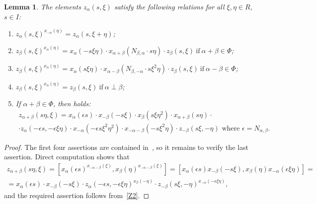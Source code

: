 \documentclass[oneside, 8pt]{amsart}
\newtheorem{lemma}{Lemma}
\theoremstyle{remark}
\theoremstyle{definition}
\numberwithin{lemma}{section}
\numberwithin{prop}{section}
\numberwithin{corollary}{section}
\numberwithin{externaltheorem}{section}
\numberwithin{equation}{section}
\begin{document}
\begin{lemma}\label{Zrels} The elements $z_\alpha(s, \xi)$ satisfy the following relations for all $\xi, \eta\in R$, $s\in I$:
\begin{enumerate} 
\item\label{Z1} $z_{\alpha}(s, \xi) ^ {x_{-\alpha}(\eta)} = z_{\alpha}(s, \xi + \eta)$;
\item\label{Z2} $z_{\beta}(s, \xi) ^ {x_{\alpha}(\eta)} = x_{\alpha} (- s\xi \eta) \cdot x_{\alpha+\beta} (N_{\beta, \alpha}\cdot s\eta)     \cdot z_{\beta}(s, \xi)\ \text{if}\ \alpha + \beta \in \Phi$;
\item\label{Z3} $z_{\beta}(s, \xi) ^ {x_{\alpha}(\eta)} = x_{\alpha} (s\xi \eta) \cdot x_{\alpha-\beta} (N_{\beta,-\alpha}\cdot s\xi^2\eta) \cdot z_{\beta}(s, \xi)\ \text{if}\ \alpha - \beta \in \Phi$;

\item\label{Z4} $z_{\beta}(s, \xi) ^ {x_{\alpha}(\eta)} = z_{\beta}(s, \xi)\ \text{if}\ \alpha\perp\beta$;
\item If $\alpha+\beta\in\Phi$, then holds:
\begin{multline} \label{Z5} z_{\alpha+\beta}(s\eta, \xi) = x_\alpha(\epsilon s)\cdot x_{-\beta}(-s\xi) \cdot x_{\beta}(s\xi\eta^2) \cdot x_{\alpha+\beta}(s \eta) \cdot \\ \cdot z_\alpha(-\epsilon s, -\epsilon \xi\eta) \cdot
  x_{-\alpha}(-\epsilon s\xi^2\eta^2) \cdot x_{-\alpha-\beta}(- s \xi^2 \eta) \cdot z_{-\beta}(s\xi, -\eta)\text{ where $\epsilon = N_{\alpha,\beta}$.}\end{multline}
\end{enumerate} \end{lemma}
\begin{proof}
The first four assertions are contained in~\cite[Lemma~9]{S15}, so it remains to verify the last assertion.
Direct computation shows that
\begin{multline} \nonumber
  z_{\alpha+\beta}(s\eta, \xi) = [x_\alpha(\epsilon s)^{x_{-\alpha-\beta}(\xi)}, x_\beta(\eta)^{x_{-\alpha-\beta}(\xi)}] =
  [x_\alpha(\epsilon s) x_{-\beta}(-s\xi), x_{\beta}(\eta) x_{-\alpha}(\epsilon \xi\eta)] = \\ 
  = x_\alpha(\epsilon s) \cdot x_{-\beta}(-s\xi) \cdot z_\alpha(-\epsilon s, -\epsilon \xi\eta)^{x_{\beta}(-\eta)} \cdot z_{-\beta}(s\xi, -\eta)^{x_{-\alpha}(-\epsilon \xi\eta)},
\end{multline} 
and the required assertion follows from~\eqref{Z2}.
\end{proof}
\end{document}
